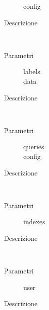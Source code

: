 \begin{description}
\begin{mldescription}
\begin{description}
\begin{description}
      
      \item[config]
      
     \end{description}
    \item[Descrizione]
   \end{description}
   
    \hfill \\
   \begin{description}
    \item[Parametri]
     \begin{description}
      \item[labels]
      \item[data]
     \end{description}
    \item[Descrizione]
   \end{description}
   
    \hfill \\
   \begin{description}
    \item[Parametri]
     \begin{description}
      \item[queries]
      \item[config]
     \end{description}
    \item[Descrizione]
   \end{description}
   
    \hfill \\
   \begin{description}
    \item[Parametri]
     \begin{description}
      \item[indexes]
     \end{description}
    \item[Descrizione]
   \end{description}
   
    \hfill \\
   \begin{description}
    \item[Parametri]
     \begin{description}
      \item[user]
     \end{description}
    \item[Descrizione]
   \end{description}
   

\end{mldescription}
\end{description}
